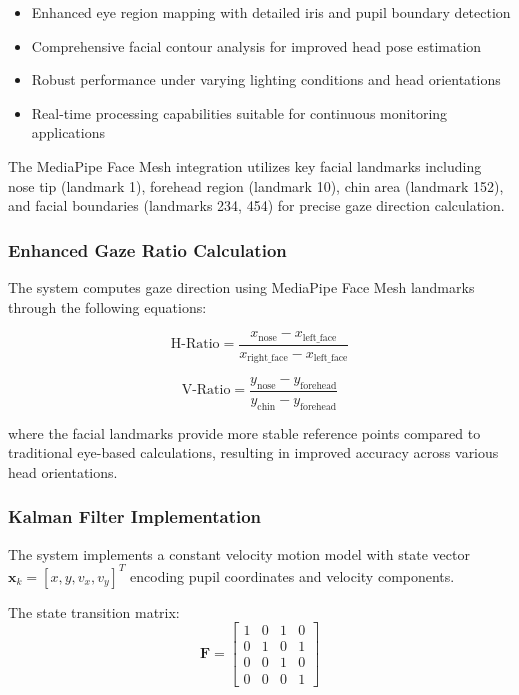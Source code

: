 \documentclass[conference]{IEEEtran}
\begin{document}
\begin{itemize}
    \item Enhanced eye region mapping with detailed iris and pupil boundary detection
    \item Comprehensive facial contour analysis for improved head pose estimation
    \item Robust performance under varying lighting conditions and head orientations
    \item Real-time processing capabilities suitable for continuous monitoring applications
\end{itemize}

The MediaPipe Face Mesh integration utilizes key facial landmarks including nose tip 
(landmark 1), forehead region (landmark 10), chin area (landmark 152), and facial 
boundaries (landmarks 234, 454) for precise gaze direction calculation.

\subsubsection{Enhanced Gaze Ratio Calculation}

The system computes gaze direction using MediaPipe Face Mesh landmarks through the 
following equations:

\begin{equation}
\text{H-Ratio} = \frac{x_{\text{nose}} - x_{\text{left\_face}}}{x_{\text{right\_face}} - x_{\text{left\_face}}}
\end{equation}

\begin{equation}
\text{V-Ratio} = \frac{y_{\text{nose}} - y_{\text{forehead}}}{y_{\text{chin}} - y_{\text{forehead}}}
\end{equation}

where the facial landmarks provide more stable reference points compared to traditional 
eye-based calculations, resulting in improved accuracy across various head orientations.

\subsubsection{Kalman Filter Implementation}

The system implements a constant velocity motion model with state vector 
$\mathbf{x}_k = [x, y, v_x, v_y]^T$ encoding pupil coordinates and velocity components. 

The state transition matrix:
\begin{equation}
\mathbf{F} = \begin{bmatrix}
1 & 0 & 1 & 0 \\
0 & 1 & 0 & 1 \\
0 & 0 & 1 & 0 \\
0 & 0 & 0 & 1
\end{bmatrix}
\end{equation}
\end{document}
